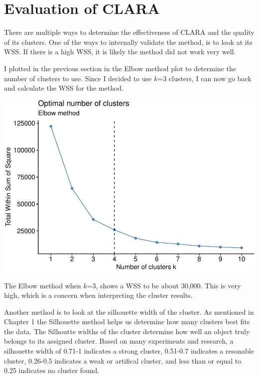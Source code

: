 \documentclass[12pt,twoside]{amherstthesis}
\begin{document}
  \section{Evaluation of CLARA}\label{evaluation-of-clara}
  
  There are multiple ways to determine the effectiveness of CLARA and the
  quality of its clusters. One of the ways to internally validate the
  method, is to look at its WSS. If there is a high WSS, it is likely the
  method did not work very well.
  
  I plotted in the previous section in the Elbow method plot to determine
  the number of clusters to use. Since I decided to use \(k\)=3 clusters,
  I can now go back and calculate the WSS for the method.
  
  \begin{Shaded}
  \begin{Highlighting}[]
  \end{Highlighting}
  \end{Shaded}
  
  \begin{center}\includegraphics{Comps_Proj_files/figure-latex/unnamed-chunk-11-1} \end{center}
  
  The Elbow method when \(k\)=3, shows a WSS to be about 30,000. This is
  very high, which is a concern when interpreting the cluster results.
  
  Another method is to look at the silhouette width of the cluster. As
  mentioned in Chapter 1 the Silhouette method helps us determine how many
  clusters best fits the data. The Silhoutte widths of the cluster
  determine how well an object truly belongs to its assigned cluster.
  Based on many experiments and research, a silhouette width of 0.71-1
  indicates a strong cluster, 0.51-0.7 indicates a resonable cluster,
  0.26-0.5 indicates a weak or artifical cluster, and less than or equal
  to 0.25 indicates no cluster found.
  
\end{document}
